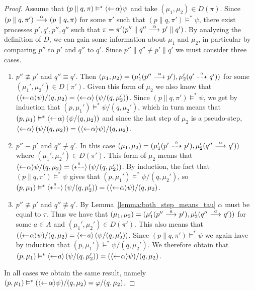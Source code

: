 \begin{proof}
    \par\nobreak
    \ltr Assume that $(p\parallel q, \pi) \vDash^* \mbox{\ensuremath{\langle\leftarrow\! \alpha \rangle}}\psi$ and take
    $(\mu_1,\mu_2)\in D(\pi)$. Since \mbox{$(p\parallel q, \pi') \ {\stackrel{{\alpha}}{\longrightarrow}}\  (p\parallel
    q, \pi)$} for some $\pi'$ such that $(p\parallel q,\pi') \vDash^* \psi$,
    there exist processes $p',q',p'',q''$ such that $\pi
    = \pi'(p''\parallel q'' \ {\stackrel{{\alpha}}{\longrightarrow}}\  p'\parallel q')$. By analyzing the definition
    of $D$, we can gain some information about $\mu_1$ and $\mu_2$, in particular by
    comparing $p''$ to $p'$ and $q''$ to $q'$. Since $p''\parallel q'' \not\equiv
    p'\parallel q'$ we must consider three cases.
    \begin{enumerate}
        \item $p''\not\equiv p'$ and $q''\equiv q'$. Then $(\mu_1,\mu_2) = (\mu_1'
            (p'' \ {\stackrel{{\alpha}}{\longrightarrow}}\  p'), \mu_2'(q' \ {\stackrel{_{0}}{\dashrightarrow}}\  q'))$ for some $(\mu_1',\mu_2')
            \in D(\pi')$. Given this form of $\mu_2$ we also know that $(\mbox{\ensuremath{\langle\leftarrow\! \alpha \rangle}}
            \psi) / (q,\mu_2) = \mbox{\ensuremath{\langle\leftarrow\! \alpha \rangle}} \left( \psi / (q,\mu_2') \right)$. Since
            $(p\parallel q, \pi') \vDash^* \psi$, we get by induction that $(p,\mu_1')
            \vDash^* \psi / (q,\mu_2')$, which in turn means that $(p,\mu_1)\vDash^*
            \mbox{\ensuremath{\langle\leftarrow\! \alpha \rangle}} \left(\psi / (q,\mu_2)\right)$ and since the last step of
            $\mu_2$ is a pseudo-step, $\mbox{\ensuremath{\langle\leftarrow\! \alpha \rangle}} \left(\psi / (q,\mu_2)\right)
            = (\mbox{\ensuremath{\langle\leftarrow\! \alpha \rangle}}\psi)/(q,\mu_2)$.
        \item $p''\equiv p'$ and $q''\not\equiv q'$. In this case $(\mu_1,\mu_2)
            = (\mu_1'(p'\ {\stackrel{_{0}}{\dashrightarrow}}\ p'), \mu_2'(q''\ {\stackrel{{\alpha}}{\longrightarrow}}\ q'))$ where $(\mu_1',
            \mu_2') \in D(\pi')$. This form of $\mu_2$ means that $\mbox{\ensuremath{\langle\leftarrow\! \alpha \rangle}}
            \psi / (q,\mu_2) = \mbox{\ensuremath{\langle\stackrel{_{0}}{\dashleftarrow}\rangle}} \left( \psi / (q,\mu_2') \right)$.
            By induction, the fact that $(p\parallel q, \pi') \vDash^* \psi$ gives
            that $(p,\mu_1') \vDash^* \psi / (q,\mu_2')$, so $(p,\mu_1) \vDash^*
            \mbox{\ensuremath{\langle\stackrel{_{0}}{\dashleftarrow}\rangle}} \left( \psi / (q,\mu_2') \right) = (\mbox{\ensuremath{\langle\leftarrow\! \alpha \rangle}}\psi)
            / (q,\mu_2)$.
        \item $p''\not\equiv p'$ and $q''\not\equiv q'$. By Lemma~\ref{lemma:both_step_means_tau}
            $\alpha$ must be equal to $\tau$. Thus we have that $(\mu_1,\mu_2) =
            (\mu_1'(p''\ {\stackrel{{a}}{\longrightarrow}}\ p'), \mu_2'(q''\ {\stackrel{{a}}{\longrightarrow}}\ q'))$ for some $a\in A$ and
            $(\mu_1',\mu_2') \in D(\pi')$. This also means that $(\mbox{\ensuremath{\langle\leftarrow\! \alpha \rangle}}\psi)
            / (q,\mu_2) = \mbox{\ensuremath{\langle\leftarrow\! a \rangle}}\left( \psi / (q,\mu_2') \right)$. Since $(p\parallel q,
            \pi') \vDash^* \psi$ we again have by induction that $(p,\mu_1')\vDash^*\psi/(q,
            \mu_2')$. We therefore obtain that $(p,\mu_1) \vDash^* \mbox{\ensuremath{\langle\leftarrow\! a \rangle}}\left(
            \psi / (q,\mu_2') \right) = (\mbox{\ensuremath{\langle\leftarrow\! \alpha \rangle}}\psi) / (q,\mu_2)$.
    \end{enumerate}
    In all cases we obtain the same result, namely $(p,\mu_1) \vDash^* (\mbox{\ensuremath{\langle\leftarrow\! \alpha \rangle}}\psi)
    / (q,\mu_2) = \varphi/(q,\mu_2)$.


\end{proof}
